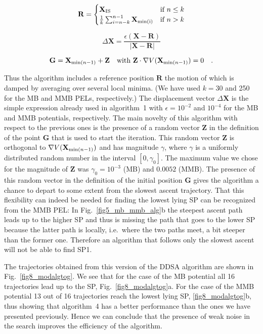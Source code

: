 \documentclass[aip,pre,twocolumn,reprint]{revtex4-1}
\begin{document}
\begin{equation}
\mathbf{R}=
\begin{cases}
    \mathbf{X}_{\rm IS} & \text{if}~n\leq k \\
    \frac{1}{k} \sum_{i=n-k}^{n-1} \mathbf{X}_{\rm min(i)} & \text{if}~n>k
\end{cases}
\label{eq_20}
\end{equation}

\begin{equation}
\Delta\mathbf{X}=\frac{\epsilon (\mathbf{X}-\mathbf{R})}{\vert \mathbf{X}-\mathbf{R} \vert}
\label{eq_21}
\end{equation}

\begin{equation}
\mathbf{G}=\mathbf{X}_{{\rm min}(n-1)}+\mathbf{Z} \quad 
\text{with}~\mathbf{Z}\cdot \nabla V(\mathbf{X}_{{\rm min}(n-1)})=0\quad.
\label{eq_22}
\end{equation}

\noindent
Thus the algorithm includes a reference position $\mathbf{R}$ the
motion of which is damped by averaging over several local minima. (We
have used $k=30$ and 250 for the MB and MMB PELs, respectively.)
The displacement vector $\Delta \mathbf{X}$ is the simple expression
already used in algorithm~1 with $\epsilon=10^{-2}$ and $10^{-4}$
for the MB and MMB potentials, respectively. The main novelty of
this algorithm with respect to the previous ones is the presence of a
random vector $\mathbf{Z}$ in the definition of the point $\mathbf{G}$
that is used to start the iteration.  This random vector $\mathbf{Z}$
is orthogonal to $\nabla V(\mathbf{X}_{{\rm min}(n-1)})$ and has
magnitude $\gamma$, where $\gamma$ is a uniformly distributed random
number in the interval $[0,\gamma_0]$. The maximum value we chose for
the magnitude of $\mathbf{Z}$ was $\gamma_0=10^{-3}$ (MB) and $0.0052$
(MMB). The presence of this random vector in the definition of the
initial position $\mathbf{G}$ gives the algorithm a chance to depart to
some extent from the slowest ascent trajectory. That this flexibility
can indeed be needed for finding the lowest lying SP can be recognized
from the MMB PEL: In Fig.~\ref{fig5_mb_mmb_alg}b the steepest ascent
path leads up to the higher SP and thus is missing the path that goes
to the lower SP because the latter path is locally, i.e.~where the two
paths meet, a bit steeper than the former one. Therefore an algorithm
that follows only the slowest ascent will not be able to find SP1.

The trajectories obtained from this version of the DDSA algorithm
are shown in Fig.~\ref{fig8_modalgtog}. We see that for the
case of the MB potential all 16 trajectories lead up to the SP,
Fig.~\ref{fig8_modalgtog}a. For the case of the MMB potential 13 out
of 16 trajectories reach the lowest lying SP, \ref{fig8_modalgtog}b,
thus showing that algorithm~4 has a better performance than the ones we
have presented previously. Hence we can conclude that the presence of
weak noise in the search improves the efficiency of the algorithm.
\end{document}
